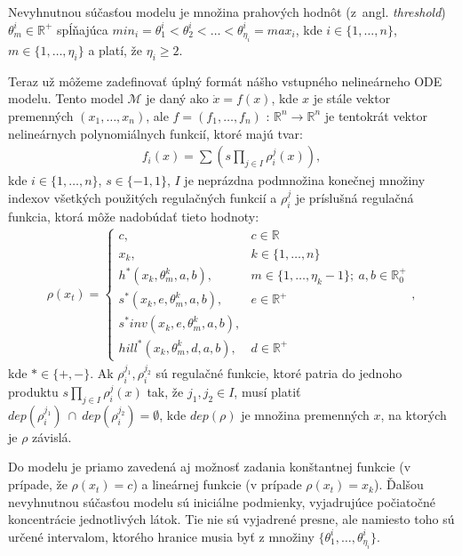 \documentclass[11pt,final,oneside]{fithesis}
\begin{document}
Nevyhnutnou s\'u\v cas\v tou modelu je mno\v zina prahov\'ych hodn\^ ot (z~angl. \textit{threshold})
$\theta_m^i \in \mathbb{R}^+$ sp\'l\v naj\'uca $min_i = \theta_1^i < \theta_2^i < \dots{} < \theta_{\eta_i}^i = max_i$, kde $i \in \{1,\dots{},n\}$, 
$m \in \{1,\dots{},\eta_i\}$ a plat\'i, \v ze $\eta_i \geq 2$.

Teraz u\v z m\^ o\v zeme zadefinova\v t \'upln\'y form\'at n\'a\v sho vstupn\'eho neline\'arneho ODE modelu. 
Tento model $\mathcal{M}$ je dan\'y ako $\dot{x} = f(x)$, 
kde $x$ je st\'ale vektor premenn\'ych $(x_1,\dots{},x_n)$, ale $f = (f_1,\dots{},f_n)$ : $\mathbb{R}^n \rightarrow \mathbb{R}^n$ je tentokr\'at vektor 
neline\'arnych polynomi\'alnych funkci\'i, ktor\'e maj\'u tvar:
\begin{align}
\label{eq:equationDescribtion1}
f_i(x) = \sum (s\underset{j \in I}\prod{\rho_i^j(x)}),
\end{align}
kde $i \in \{1,\dots{},n\}$, $s \in \{-1,1\}$, $I$ je nepr\'azdna podmno\v zina kone\v cnej mno\v ziny indexov v\v setk\'ych pou\v zit\'ych regula\v cn\'ych
funkci\'i a $\rho_i^j$ je pr\'islu\v sn\'a regula\v cn\'a funkcia, ktor\'a m\^ o\v ze nadob\'uda\v t tieto hodnoty:
\begin{align}
\label{eq:regulatingFunctions1}
\rho(x_t) = 
\left\{ \begin{array}{cl}
c, &c \in \mathbb{R}\\
x_k, & k \in \{1,\dots{},n\}\\
h^*(x_k,\theta_m^k,a,b), &m \in \{1,\dots{},\eta_k-1\}; \ a,b \in \mathbb{R}_0^+\\
s^*(x_k,e,\theta_m^k,a,b), &e \in \mathbb{R}^+\\
s^*inv(x_k,e,\theta_m^k,a,b),\\
hill^*(x_k,\theta_m^k,d,a,b), &d \in \mathbb{R}^+
\end{array} \right. ,
\end{align}
kde $* \in \{+,-\}$. Ak $\rho_i^{j_1}, \rho_i^{j_2}$ s\'u regula\v cn\'e funkcie, ktor\'e patria do jednoho produktu $s\underset{j \in I}\prod\rho_i^j(x)$
tak, \v ze $j_1, j_2 \in I$, mus\'i plati\v t $dep(\rho_i^{j_1})\ \cap\ dep(\rho_i^{j_2}) = \emptyset$, kde $dep(\rho)$ je mno\v zina premenn\'ych $x$,
na ktor\'ych je $\rho$ z\'avisl\'a.

Do modelu je priamo zaveden\'a aj mo\v znos\v t zadania kon\v stantnej funkcie (v pr\'ipade, \v ze $\rho(x_t) = c$) a line\'arnej funkcie 
(v pr\'ipade $\rho(x_t) = x_k$). \v Dal\v sou nevyhnutnou s\'u\v cas\v tou modelu s\'u inici\'alne podmienky, vyjadruj\'uce 
po\v ciato\v cn\'e koncentr\'acie jednotliv\'ych l\'atok. Tie nie s\'u vyjadren\'e presne, ale namiesto toho s\'u ur\v cen\'e intervalom, ktor\'eho
hranice musia by\v t z mno\v ziny $\{ \theta_1^i,\dots{},\theta_{\eta_i}^i \}$.
\end{document}
